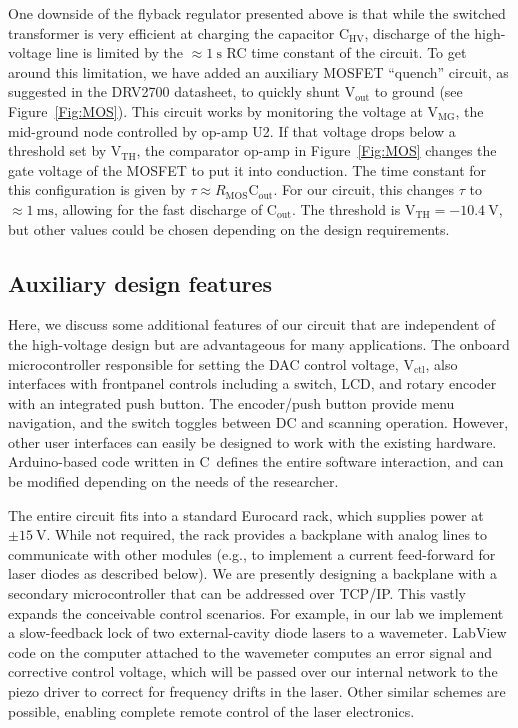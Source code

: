 \documentclass[aip,rsi,reprint]{revtex4-1} %
\newcommand{\CC}{{C\nolinebreak[4]\hspace{-.05em}\raisebox{.4ex}{\tiny\bf ++}}~}
\begin{document}
One downside of the flyback regulator presented above is that while the switched transformer is very efficient at charging the capacitor $\text{C}_\text{HV}$, discharge of the high-voltage line is limited by the $\approx\SI{1}{\second}$ RC time constant of the circuit.
To get around this limitation, we have added an auxiliary MOSFET ``quench'' circuit, as suggested in the DRV2700 datasheet, to quickly shunt $\text{V}_\text{out}$ to ground (see Figure~\ref{Fig:MOS}).
This circuit works by monitoring the voltage at $\text{V}_\text{MG}$, the mid-ground node controlled by op-amp U2.
If that voltage drops below a threshold set by $\text{V}_\text{TH}$, the comparator op-amp in Figure~\ref{Fig:MOS} changes the gate voltage of the MOSFET to put it into conduction.
The time constant for this configuration is given by $\tau \approx R_\text{MOS}\text{C}_\text{out}$. For our circuit, this changes $\tau$ to $\approx\SI{1}{\milli\second}$, allowing for the fast discharge of $\text{C}_\text{out}$. 
The threshold is $\text{V}_\text{TH} = \SI{-10.4}{\volt}$, but other values could be chosen depending on the design requirements.

\subsection{Auxiliary design features}
\label{Sec:AuxDesign}

Here, we discuss some additional features of our circuit that are independent of the high-voltage design but are advantageous for many applications.
The onboard microcontroller responsible for setting the DAC control voltage, $\text{V}_\text{ctl}$, also interfaces with frontpanel controls including a switch, LCD, and rotary encoder with an integrated push button.
The encoder/push button provide menu navigation, and the switch toggles between DC and scanning operation.
However, other user interfaces can easily be designed to work with the existing hardware.
Arduino-based code written in \CC defines the entire software interaction, and can be modified depending on the needs of the researcher.

The entire circuit fits into a standard Eurocard rack, which supplies power at $\pm\SI{15}{\volt}$.
While not required, the rack provides a backplane with analog lines to communicate with other modules (e.g., to implement a current feed-forward for laser diodes as described below).
We are presently designing a backplane with a secondary microcontroller that can be addressed over TCP/IP.
This vastly expands the conceivable control scenarios. 
For example, in our lab we implement a slow-feedback lock of two external-cavity diode lasers to a wavemeter.
LabView code on the computer attached to the wavemeter computes an error signal and corrective control voltage, which will be passed over our internal network to the piezo driver to correct for frequency drifts in the laser.
Other similar schemes are possible, enabling complete remote control of the laser electronics.
\end{document}

